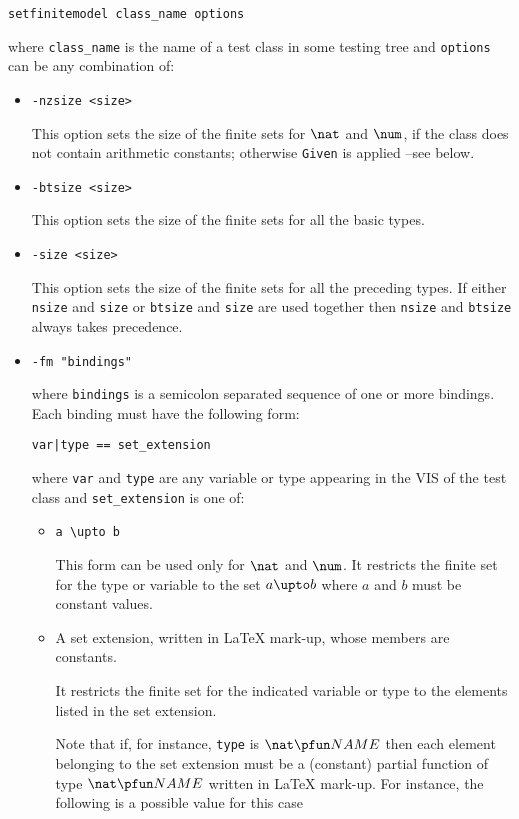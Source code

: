 \begin{verbatim}
setfinitemodel class_name options
\end{verbatim}

\noindent where \verb+class_name+ is the name of a test class in some testing tree and \verb+options+ can be any combination of:

\begin{itemize}
\item \verb+-nzsize <size>+

This option sets the size of the finite sets for $\nat$ and $\num$, if the class does not contain arithmetic constants; otherwise \verb+Given+ is applied --see below.

\item \verb+-btsize <size>+

This option sets the size of the finite sets for all the basic types.

\item \verb+-size <size>+

This option sets the size of the finite sets for all the preceding types. If either \verb+nsize+ and \verb+size+ or \verb+btsize+ and \verb+size+ are used together then \verb+nsize+ and \verb+btsize+ always takes precedence.

\item \verb+-fm "bindings"+

where \verb+bindings+  is a semicolon separated sequence of one or more bindings. Each binding must have the following form:

\verb+var|type == set_extension+

where \verb+var+ and \verb+type+ are any variable or type appearing in the VIS of the test class and \verb+set_extension+ is one of:

\begin{itemize}
\item \verb+a \upto b+

This form can be used only for $\nat$ and $\num$. It restricts the finite set for the type or variable to the set $a \upto b$ where $a$ and $b$ must be constant values.

\item A set extension, written in \LaTeX{} mark-up, whose members are constants. 

It restricts the finite set for the indicated variable or type to the elements listed in the set extension. 

Note that if, for instance, \verb+type+ is $\nat \pfun NAME$ then each element belonging to the set extension must be a (constant) partial function of type $\nat \pfun NAME$ written in \LaTeX{} mark-up. For instance, the following is a possible value for this case


\end{itemize}
\end{itemize}
